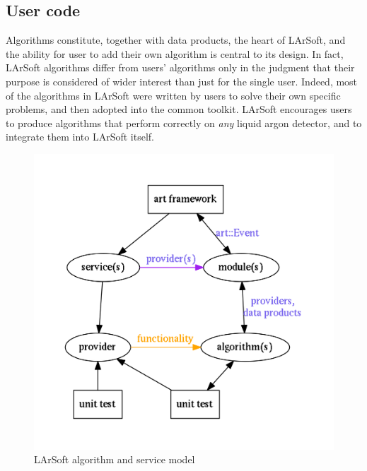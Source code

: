 \subsection{User code}
\label{ssec:Development:UserCode}

Algorithms constitute, together with data products, the heart of LArSoft,
and the ability for user to add their own algorithm is central to its design.
In fact, LArSoft algorithms differ from users' algorithms
only in the judgment that their purpose is considered of wider interest
than just for the single user.
Indeed, most of the algorithms in LArSoft were written by users to solve their own specific problems,
and then adopted into the common toolkit.
LArSoft encourages users to produce algorithms that perform correctly on \emph{any} liquid argon detector,
and to integrate them into LArSoft itself.

\begin{figure}
   \centering
   \includegraphics[width=\textwidth]{figures/LArSoftSimplifiedFactorizationModel.pdf}
   \caption{\label{fig:AlgorithmModel}LArSoft algorithm and service model}
\end{figure}


